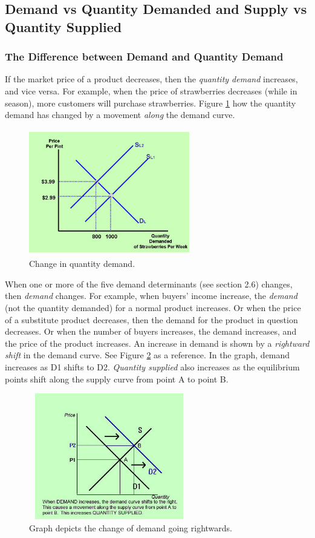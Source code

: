 \documentclass[a4paper, 12pt] {article}
\begin{document}
\subsection{Demand vs Quantity Demanded and Supply vs Quantity Supplied}
\subsubsection{The Difference between Demand and Quantity Demand}
If the market price of a product decreases, then the \emph{quantity demand} increases,
and vice versa. For example, when the price of strawberries decreases (while 
in season), more customers will purchase strawberries. Figure \ref{fig:quant_dem}
how the quantity demand has changed by a movement \emph{along} the demand curve.
\begin{figure}[h]
    \centering
    \includegraphics[height=5.5cm, width=7cm]{quantity_demand.jpg}
    \caption{Change in quantity demand.}
    \label{fig:quant_dem}
\end{figure}

When one or more of the five demand determinants (see section 2.6) changes, then
\emph{demand} changes. For example, when buyers' income increase, the \emph{demand}
(not the quantity demanded) for a normal product increases. Or when the price of
a substitute product decreases, then the demand for the product in question 
decreases. Or when the number of buyers increases, the demand increases, and the
price of the product increases. An increase in demand is shown by a \emph{rightward
shift} in the demand curve. See Figure \ref{fig:demand_shift} as a reference.
In the graph, demand increases as D1 shifts to D2. \emph{Quantity supplied} also
increases as the equilibrium points shift along the supply curve from point A
to point B.
\begin{figure}[h]
    \centering
    \includegraphics[height=5.5cm, width=7cm]{demand_shift.jpg}
    \caption{Graph depicts the change of demand going rightwards.}
    \label{fig:demand_shift}
\end{figure}
\end{document}
